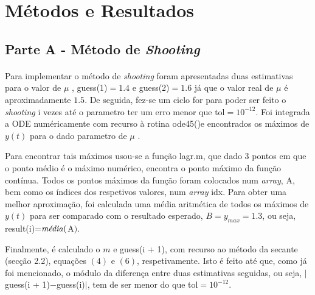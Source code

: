 \documentclass[a4paper, 11pt]{article}
\newcommand{\ode}{{\fontfamily{pcr}\selectfont ode45()}}
\newcommand{\guessi}{{\fontfamily{pcr}\selectfont guess(i)}}
\newcommand{\guessii}{{\fontfamily{pcr}\selectfont guess(i + 1)}}
\newcommand{\resi}{{\fontfamily{pcr}\selectfont result(i)}}
\newcommand{\m}{$\mu$ }
\newcommand{\shooting}{\textit{shooting} }
\newcommand{\Shooting}{\textit{Shooting} }
\begin{document}
	\section{Métodos e Resultados}
	\paragraph{}
	\subsection{Parte A - Método de \Shooting}
	\paragraph{}
	Para implementar o método de \shooting foram apresentadas duas estimativas para o valor de \m, {\selectfont guess(1)}$= 1.4$ e {\selectfont guess(2)}$= 1.6$ já que o valor real de \m é aproximadamente $1.5$. De seguida, fez-se um ciclo {\selectfont for} para poder ser feito o \shooting {\selectfont i} vezes até o parametro ter um erro menor que {\selectfont tol}$=10^{-12}$. Foi integrada a ODE numéricamente com recurso à rotina \ode e encontrados os máximos de $y(t)$ para o dado parametro de \m.
	
	Para encontrar tais máximos usou-se a função {\selectfont lagr.m}, que dado 3 pontos em que o ponto médio é o máximo numérico, encontra o ponto máximo da função contínua. Todos os pontos máximos da função foram colocados num \textit{array}, {\selectfont A}, bem como os índices dos respetivos valores, num \textit{array} {\selectfont idx}. Para obter uma melhor aproximação, foi calculada uma média aritmética de todos os máximos de $y(t)$ para ser comparado com o resultado esperado, $B=y_{max}=1.3$, ou seja, \resi=$\text{\textit{média}}(${\selectfont A}$)$.
	
	Finalmente, é calculado o $m$ e \guessii, com recurso ao método da secante (secção 2.2), equações $(4)$ e $(6)$, respetivamente. Isto é feito até que, como já foi mencionado, o módulo da diferença entre duas estimativas seguidas, ou seja, $|$ \guessii$ - $\guessi $|$, tem de ser menor do que {\selectfont tol}$=10^{-12}$.
	
\end{document}
